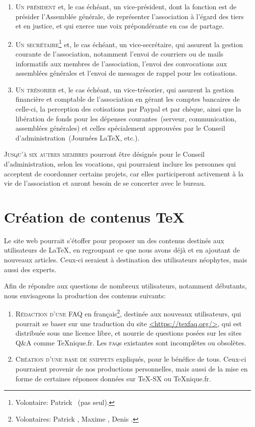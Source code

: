\documentclass{tufte-handout}
\newcommand{\ratio}[3][]{\marginpar{\footnotesize{\textcolor{teal}{Temps requis: #2 / Utilité: #3}\par\noindent \textcolor{teal}{#1}}}}
\begin{document}
\begin{enumerate}
	\item\textsc{Un président} et, le cas échéant, un vice-président, dont la fonction est de présider l'Assemblée générale, de représenter l'association à l'égard des tiers et en justice, et qui exerce une voix prépondérante en cas de partage.
	\item\textsc{Un secrétaire}\footnote{Volontaire: Patrick ~(pas seul).} et, le cas échéant, un vice-secrétaire, qui assurent la gestion courante de l'association, notamment l'envoi de courriers ou de mails informatifs aux membres de l'association, l'envoi des convocations aux assemblées générales et l'envoi de messages de rappel pour les cotisations.
	\item\textsc{Un trésorier} et, le cas échéant, un vice-trésorier, qui assurent la gestion financière et comptable de l'association en gérant les comptes bancaires de celle-ci, la perception des cotisations par Paypal et par chèque, ainsi que la libération de fonds pour les dépenses courantes~(serveur, communication, assemblées générales) et celles spécialement approuvées par le Conseil d'administration~(Journées \LaTeX, etc.).
\end{enumerate}

\textsc{Jusqu'à six autres membres} pourront être désignés pour le Conseil d'administration, selon les vocations, qui pourraient inclure les personnes qui acceptent de coordonner certains projets, car elles participeront activement à la vie de l'association et auront besoin de se concerter avec le bureau.

\section{Création de contenus \TeX}

Le site web pourrait s'étoffer pour proposer un des contenus destinés aux utilisateurs de \LaTeX, en regroupant ce que nous avons déjà et en ajoutant de nouveaux articles. Ceux-ci seraient à destination des utilisateurs néophytes, mais aussi des experts.

Afin de répondre aux questions de nombreux utilisateurs, notamment débutants, nous envisageons la production des contenus suivants:

\begin{enumerate}
	\item\textsc{Rédaction d'une FAQ}\ratio[Effort collectif possible]{+++}{+++} en français\footnote{Volontaires: Patrick , Maxime , Denis .}, destinée aux nouveaux utilisateurs, qui pourrait se baser sur une traduction du site \url{<https://texfaq.org/>}, qui est distribuée sous une licence libre, et nourrie de questions posées sur les sites Q\&A comme \TeX nique.fr. Les \textsc{faq}s existantes sont incomplètes ou obsolètes.
	\item\textsc{Création d'une base de snippets}\ratio[Petites contributions régulières, sur le long terme]{++}{+++}  expliqués, pour le bénéfice de tous. Ceux-ci pourraient provenir de nos productions personnelles, mais aussi de la mise en forme de certaines réponses données sur TeX-SX ou \TeX nique.fr.
\end{enumerate}
\end{document}
